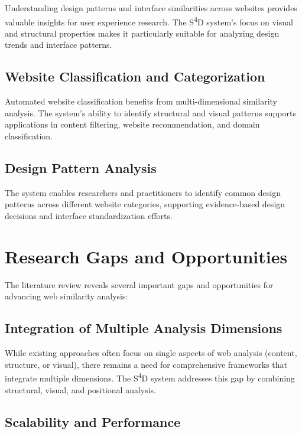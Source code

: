 Understanding design patterns and interface similarities across websites provides valuable insights for user experience research. The S\textsuperscript{4}D system's focus on visual and structural properties makes it particularly suitable for analyzing design trends and interface patterns.

\subsection{Website Classification and Categorization}

Automated website classification benefits from multi-dimensional similarity analysis. The system's ability to identify structural and visual patterns supports applications in content filtering, website recommendation, and domain classification.

\subsection{Design Pattern Analysis}

The system enables researchers and practitioners to identify common design patterns across different website categories, supporting evidence-based design decisions and interface standardization efforts.

\section{Research Gaps and Opportunities}
\label{sec:research-gaps}

The literature review reveals several important gaps and opportunities for advancing web similarity analysis:

\subsection{Integration of Multiple Analysis Dimensions}

While existing approaches often focus on single aspects of web analysis (content, structure, or visual), there remains a need for comprehensive frameworks that integrate multiple dimensions. The S\textsuperscript{4}D system addresses this gap by combining structural, visual, and positional analysis.

\subsection{Scalability and Performance}

